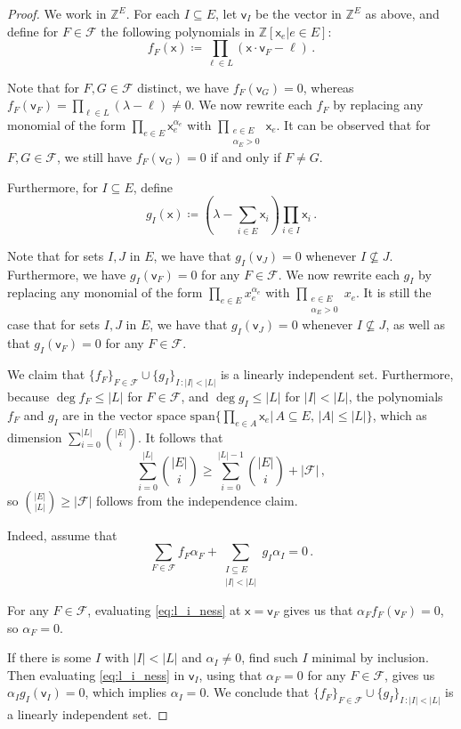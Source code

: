 \documentclass[12pt]{amsart}
\theoremstyle{definition}
\newcommand{\Z}{\mathbb{Z}}
\newcommand{\FF}{\mathcal F}
\newcommand{\vv}{\mathsf{v}}
\newcommand{\vx}{\mathsf{x}}
\newcommand{\spn}{\mathrm{span}}
\begin{document}
\begin{proof}
We work in $\Z^E$.
For each $I \subseteq E$, let $\vv_I$ be the vector in $\Z^E$ as above, and define for $F \in \FF$ the following polynomials in $\Z[\vx_e | e \in E]$:
$$f_F(\vx) \coloneqq \prod_{\ell \in L } (\vx \cdot \vv_{F} - \ell ) \, .$$

Note that for $F, G \in \FF$ distinct, we have $f_F(\vv_G) = 0$, whereas $f_F(\vv_F) = \prod_{\ell \in L } (\lambda - \ell )\neq 0$.
We now rewrite each $f_F$ by replacing any monomial of the form $\prod_{e\in E}\vx_e^{\alpha_e}$ with $\prod_{\substack{e\in E\\ \alpha_E > 0}}\vx_e$.
It can be observed that for $F, G \in \FF$, we still have $f_F(\vv_G) = 0$ if and only if $F \neq G$.


Furthermore, for $I\subseteq E$, define 
$$g_I(\vx) \coloneqq (\lambda - \sum_{i\in E} \vx_i)\prod_{i\in I} \vx_i\, .$$

Note that for sets $I, J$ in $E$, we have that $g_I(\vv_J ) = 0$ whenever $I\not\subseteq J$.
Furthermore, we have $g_I(\vv_F) = 0$ for any $F \in \FF$.
We now rewrite each $g_I$ by replacing any monomial of the form $\prod_{e\in E}x_e^{\alpha_e}$ with $\prod_{\substack{e\in E\\ \alpha_E > 0}}x_e$.
It is still the case that for sets $I, J$ in $E$, we have that $g_I(\vv_J ) = 0$ whenever $I\not\subseteq J$, as well as that $g_I(\vv_F) = 0$ for any $F \in \FF$.

We claim that $\{ f_F \}_{F \in \FF}\cup \{g_I \}_{I \, : |I| < |L| }$ is a linearly independent set.
Furthermore, because $\deg f_F \leq |L|$ for $F \in \FF$, and $\deg g_I \leq |L|$ for $|I| < |L|$, the polynomials $f_F$ and $g_I$ are in the vector space $\spn\{\prod_{e \in A} \vx_e | \, A \subseteq E, \, |A| \leq |L| \}$, which as dimension $\sum_{i=0}^{|L|} \binom{|E|}{i}$.
It follows that
$$ \sum_{i=0}^{|L|} \binom{|E|}{i} \geq \sum_{i=0}^{|L|-1} \binom{|E|}{i} + |\FF| \, ,$$
so $\binom{|E|}{|L|} \geq |\FF|$ follows from the independence claim.

Indeed, assume that 
\begin{equation}\label{eq:l_i_ness}
\sum_{F \in \FF} f_F \alpha_F + \sum_{\substack{I \subseteq E\\ |I| < |L|}} g_I \alpha_I =0 \, .
\end{equation}

For any $F \in \FF$, evaluating \eqref{eq:l_i_ness} at $\vx = \vv_F $ gives us that $\alpha_F f_F(\vv_F) = 0$, so $\alpha_F = 0$.

If there is some $I$ with $|I| < |L|$ and $\alpha_I \neq 0$, find such $I$ minimal by inclusion.
Then evaluating \eqref{eq:l_i_ness} in $\vv_I$, using that $\alpha_F = 0$ for any $F \in \FF$, gives us $\alpha_I g_I(\vv_I) = 0$, which implies $\alpha_I = 0$.
We conclude that $\{ f_F \}_{F \in \FF}\cup \{g_I \}_{I \, : |I| < |L| }$ is a linearly independent set.
\end{proof}
\end{document}
